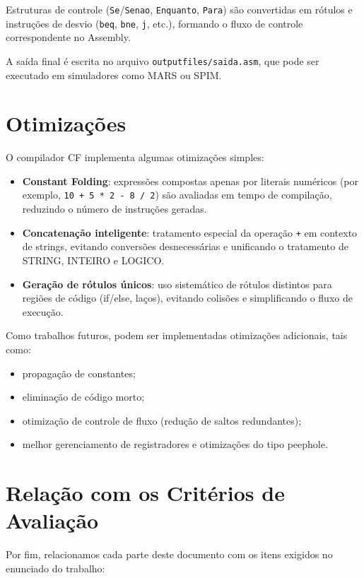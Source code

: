 \documentclass[12pt,a4paper]{article}
\begin{document}
Estruturas de controle (\texttt{Se}/\texttt{Senao}, \texttt{Enquanto}, \texttt{Para}) são convertidas em rótulos e instruções de desvio (\texttt{beq}, \texttt{bne}, \texttt{j}, etc.), formando o fluxo de controle correspondente no Assembly.

A saída final é escrita no arquivo \texttt{outputfiles/saida.asm}, que pode ser executado em simuladores como MARS ou SPIM.

\section{Otimizações}
\label{sec:otimizacoes}

O compilador CF implementa algumas otimizações simples:

\begin{itemize}
  \item \textbf{Constant Folding}: expressões compostas apenas por literais numéricos (por exemplo, \texttt{10 + 5 * 2 - 8 / 2}) são avaliadas em tempo de compilação, reduzindo o número de instruções geradas.
  \item \textbf{Concatenação inteligente}: tratamento especial da operação \texttt{+} em contexto de strings, evitando conversões desnecessárias e unificando o tratamento de STRING, INTEIRO e LOGICO.
  \item \textbf{Geração de rótulos únicos}: uso sistemático de rótulos distintos para regiões de código (if/else, laços), evitando colisões e simplificando o fluxo de execução.
\end{itemize}

Como trabalhos futuros, podem ser implementadas otimizações adicionais, tais como:

\begin{itemize}
  \item propagação de constantes;
  \item eliminação de código morto;
  \item otimização de controle de fluxo (redução de saltos redundantes);
  \item melhor gerenciamento de registradores e otimizações do tipo peephole.
\end{itemize}

\section{Relação com os Critérios de Avaliação}
\label{sec:avaliacao}

Por fim, relacionamos cada parte deste documento com os itens exigidos no enunciado do trabalho:
\end{document}
